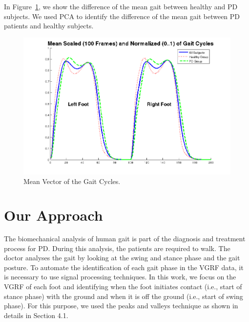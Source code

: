 \documentclass[10pt, conference, compsocconf]{IEEEtran}
\begin{document}
In Figure~\ref{fig:diferencemean}, we show the difference of the mean gait between healthy and PD subjects.  We used PCA to identify the difference of the mean gait between PD patients and healthy subjects.

\begin{figure}[!h]
\centering	
\includegraphics[width=.52\textwidth]{img/meangait.png}
\caption{Mean Vector of the Gait Cycles.}
\label{fig:diferencemean}
\end{figure}

%

%



\section{Our Approach}
\label{sec:overview}
The biomechanical analysis of human gait is part of the diagnosis and treatment process for PD. During this analysis, the patients are required to walk. The doctor analyses the gait by looking at the swing and stance phase and the gait posture. To automate the identification of each gait phase in the VGRF data, it is necessary to use signal processing techniques. In this work, we focus on the VGRF of each foot and identifying when the foot initiates contact (i.e., start of stance phase) with the ground and when it is off the ground (i.e., start of swing phase). For this purpose, we used the peaks and valleys technique as shown in details in Section 4.1.
\end{document}
